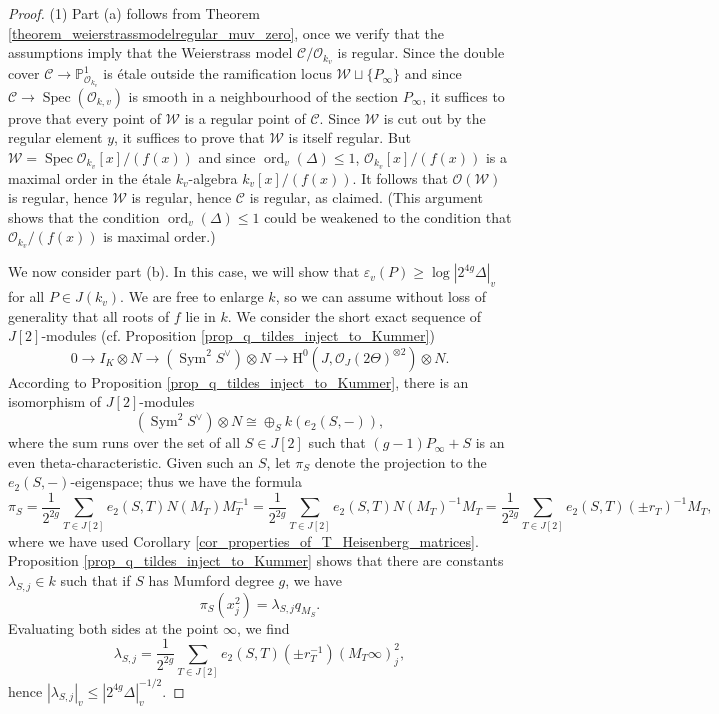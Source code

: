 \documentclass[10pt,a4paper]{amsart}
\DeclareMathOperator{\Spec}{Spec}
\DeclareMathOperator{\Sym}{Sym}
\DeclareMathOperator{\ord}{ord}
\newcommand{\HH}{\mathrm{H}}
\newcommand{\cO}{\mathcal{O}}
\renewcommand{\O}{\mathcal{O}}
\renewcommand{\P}{\mathbb{P}}
\begin{document}
\begin{proof}
    (1) Part (a) follows from Theorem \ref{theorem_weierstrassmodelregular_muv_zero}, once we verify that the assumptions imply that the Weierstrass model $\mathcal{C}/\O_{k_v}$ is regular. 
    Since the double cover $\mathcal{C} \rightarrow \P^1_{\O_{k_v}}$ is \'etale outside the ramification locus $\mathcal{W}\sqcup \{P_{\infty}\}$ and since $\mathcal{C}\rightarrow \Spec(\O_{k,v})$ is smooth in a neighbourhood of the section $P_{\infty}$, it suffices to prove that every point of $\mathcal{W}$ is a regular point of $\mathcal{C}$.
    Since $\mathcal{W}$ is cut out by the regular element $y$, it suffices to prove that $\mathcal{W}$ is itself regular.
    But $\mathcal{W} = \Spec\O_{k_v}[x]/(f(x))$ and since $\ord_v(\Delta)\leq 1$, $\O_{k_v}[x]/(f(x))$ is a maximal order in the \'etale $k_v$-algebra  $k_v[x]/(f(x))$.
    It follows that $\O(\mathcal{W})$ is regular, hence $\mathcal{W}$ is regular, hence $\mathcal{C}$ is regular, as claimed. (This argument shows that the condition $\ord_v(\Delta) \leq 1$ could be weakened to the condition that $\cO_{k_v} / (f(x))$ is maximal order.)

    We now consider part (b). In this case, we will show that $\varepsilon_v(P) \geq \log | 2^{4g} \Delta |_v$ for all $P\in  J(k_v)$. We are free to enlarge $k$, so we can assume without loss of generality that all roots of $f$ lie in $k$. We consider the short exact sequence of $J[2]$-modules (cf. Proposition \ref{prop_q_tildes_inject_to_Kummer})
    \[ 0 \to I_K \otimes N \to (\Sym^2 S^\vee) \otimes N \to\HH^0(J, \O_J(2\Theta)^{\otimes 2}) \otimes N. \]
    According to Proposition \ref{prop_q_tildes_inject_to_Kummer}, there is an isomorphism of $J[2]$-modules 
    \[ (\Sym^2 S^\vee) \otimes N \cong \oplus_S k(e_2(S, -)), \]
    where the sum runs over the set of all $S \in J[2]$ such that $(g-1) P_\infty + S$ is an even theta-characteristic. Given such an $S$, let $\pi_S$ denote the projection to the $e_2(S, -)$-eigenspace; thus we have the formula
    \[ \pi_S = \frac{1}{2^{2g}} \sum_{T \in J[2]} e_2(S, T) N(M_T) M_T^{-1} = \frac{1}{2^{2g}} \sum_{T \in J[2]} e_2(S, T) N(M_T)^{-1} M_T = \frac{1}{2^{2g}} \sum_{T \in J[2]} e_2(S, T) (\pm r_{T})^{-1} M_T, \]
    where we have used Corollary \ref{cor_properties_of_T_Heisenberg_matrices}. Proposition \ref{prop_q_tildes_inject_to_Kummer} shows that there are constants $\lambda_{S, j} \in k$ such that if $S$ has Mumford degree $g$, we have
    \[ \pi_S(x_j^2) = \lambda_{S, j} q_{M_S}. \]
    Evaluating both sides at the point $\infty$, we find
    \[ \lambda_{S, j} =\frac{1}{2^{2g}} \sum_{T \in J[2]} e_2(S, T) (\pm r_{T}^{-1}) (M_T \infty)_j^2, \]
    hence $|\lambda_{S, j}|_v \leq | 2^{4g} \Delta |_v^{-1/2}$. 
    

\end{proof}
\end{document}
